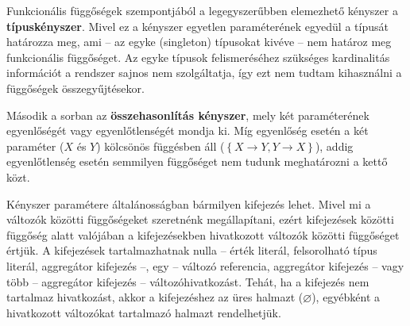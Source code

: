 Funkcionális függőségek szempontjából a legegyszerűbben elemezhető kényszer a \textbf{típuskényszer}.
Mivel ez a kényszer egyetlen paraméterének egyedül a típusát határozza meg, ami -- az egyke (singleton) típusokat kivéve -- nem határoz meg funkcionális függőséget.
Az egyke típusok felismeréséhez szükséges kardinalitás információt a rendszer sajnos nem szolgáltatja, így ezt nem tudtam kihasználni a függőségek összegyűjtésekor.

Második a sorban az \textbf{összehasonlítás kényszer}, mely két paraméterének egyenlőségét vagy egyenlőtlenségét mondja ki.
Míg egyenlőség esetén a két paraméter ($X$ és $Y$) kölcsönös függésben áll ($\left\{ X \rightarrow Y , Y \rightarrow X \right\}$), addig egyenlőtlenség esetén semmilyen függőséget nem tudunk meghatározni a kettő közt.

Kényszer paramétere általánosságban bármilyen kifejezés lehet.
Mivel mi a változók közötti függőségeket szeretnénk megállapítani, ezért kifejezések közötti függőség alatt valójában a kifejezésekben hivatkozott változók közötti függőséget értjük.
A kifejezések tartalmazhatnak nulla -- érték literál, felsorolható típus literál, aggregátor kifejezés --, egy -- változó referencia, aggregátor kifejezés -- vagy több -- aggregátor kifejezés -- változóhivatkozást.
Tehát, ha a kifejezés nem tartalmaz hivatkozást, akkor a kifejezéshez az üres halmazt ($\varnothing$), egyébként a hivatkozott változókat tartalmazó halmazt rendelhetjük.

